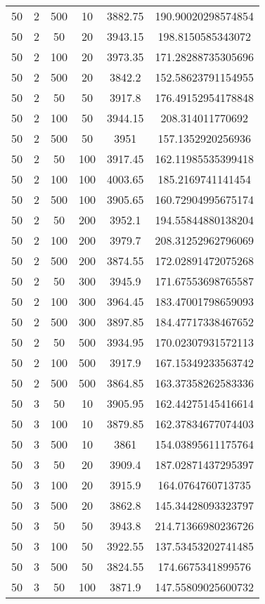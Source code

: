 {\begin{longtabu}{S
S
S
S
S[round-mode=places, round-precision=0]
S[round-mode=places, round-precision=0]}
50 & 2 & 500 & 10 & 3882.75 & 190.90020298574854 \\
50 & 2 & 50 & 20 & 3943.15 & 198.8150585343072 \\
50 & 2 & 100 & 20 & 3973.35 & 171.28288735305696 \\
50 & 2 & 500 & 20 & 3842.2 & 152.58623791154955 \\
50 & 2 & 50 & 50 & 3917.8 & 176.49152954178848 \\
50 & 2 & 100 & 50 & 3944.15 & 208.314011770692 \\
50 & 2 & 500 & 50 & 3951 & 157.1352920256936 \\
50 & 2 & 50 & 100 & 3917.45 & 162.11985535399418 \\
50 & 2 & 100 & 100 & 4003.65 & 185.2169741141454 \\
50 & 2 & 500 & 100 & 3905.65 & 160.72904995675174 \\
50 & 2 & 50 & 200 & 3952.1 & 194.55844880138204 \\
50 & 2 & 100 & 200 & 3979.7 & 208.31252962796069 \\
50 & 2 & 500 & 200 & 3874.55 & 172.02891472075268 \\
50 & 2 & 50 & 300 & 3945.9 & 171.67553698765587 \\
50 & 2 & 100 & 300 & 3964.45 & 183.47001798659093 \\
50 & 2 & 500 & 300 & 3897.85 & 184.47717338467652 \\
50 & 2 & 50 & 500 & 3934.95 & 170.02307931572113 \\
50 & 2 & 100 & 500 & 3917.9 & 167.15349233563742 \\
50 & 2 & 500 & 500 & 3864.85 & 163.37358262583336 \\
50 & 3 & 50 & 10 & 3905.95 & 162.44275145416614 \\
50 & 3 & 100 & 10 & 3879.85 & 162.37834677074403 \\
50 & 3 & 500 & 10 & 3861 & 154.03895611175764 \\
50 & 3 & 50 & 20 & 3909.4 & 187.02871437295397 \\
50 & 3 & 100 & 20 & 3915.9 & 164.0764760713735 \\
50 & 3 & 500 & 20 & 3862.8 & 145.34428093323797 \\
50 & 3 & 50 & 50 & 3943.8 & 214.71366980236726 \\
50 & 3 & 100 & 50 & 3922.55 & 137.53453202741485 \\
50 & 3 & 500 & 50 & 3824.55 & 174.6675341899576 \\
50 & 3 & 50 & 100 & 3871.9 & 147.55809025600732 \\

\end{longtabu}}

